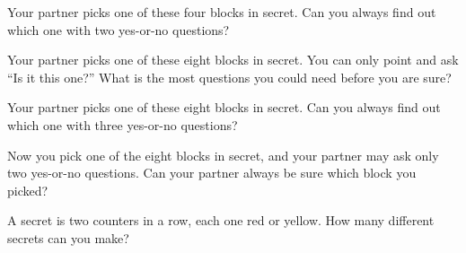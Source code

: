
\renewcommand{\blkscale}{0.72}

\newcommand{\kpuzzle}[1]{%
  \par\noindent
  \begin{minipage}[c]{1.9in}\kidtests{#1}\end{minipage}%
  \hfill\slotrow{2}\hspace{0.4in}\slotrow{2}\par}



\fontsize{14}{19}\selectfont

\problem Your partner picks one of these four blocks in secret.
Can you always find out which one with two yes-or-no questions?

\fourblocks

\vspace{1.3in}

\problem Your partner picks one of these eight blocks in secret.
You can only point and ask ``Is it this one?''
What is the most questions you could need before you are sure?

\eightblocks

\newpage

\problem Your partner picks one of these eight blocks in secret.
Can you always find out which one with three yes-or-no questions?

\eightblocks

\vspace{1.4in}

\problem Now you pick one of the eight blocks in secret, and your partner may ask only two yes-or-no questions.
Can your partner always be sure which block you picked?

\newpage

\problem A secret is two counters in a row, each one red or yellow.
How many different secrets can you make?

\vspace{0.35in}
\noindent\hspace*{0.6in}\hfill{}\hspace*{0.6in}\par
\vspace{0.45in}
\noindent\hspace*{0.6in}\hfill{}\hspace*{0.6in}\par
\vspace{0.45in}
\noindent\hspace*{0.6in}\hfill{}\hspace*{0.6in}\par

